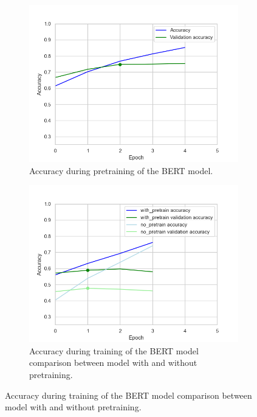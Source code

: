 \documentclass[acmsmall,nonacm]{acmart}
\begin{document}
\begin{figure}[h!] 
  \begin{subfigure}[b]{0.4\linewidth}
    \includegraphics[width=\textwidth]{assets/bert-base-cased_accuracy.png}
    \caption{Accuracy during pretraining of the BERT model.}
    \label{fig:bert_model_pretrain}
    \vspace{2ex}
  \end{subfigure}%
  \hfill
  \begin{subfigure}[b]{0.4\linewidth}
    \includegraphics[width=\textwidth]{assets/bert-base-cased_comparison_with_pretrain_no_pretrain.png}
    \caption{Accuracy during training of the BERT model comparison between model with and without pretraining.}
    \label{fig:bert_model_train}

\end{subfigure}
\end{figure}
\end{document}
